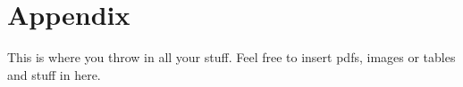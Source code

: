 \documentclass{../Main/main.tex}{subfiles}
\begin{document}
\chapter{Appendix}

This is where you throw in all your stuff. Feel free to insert pdfs, images or tables and stuff in here.
\end{document}
